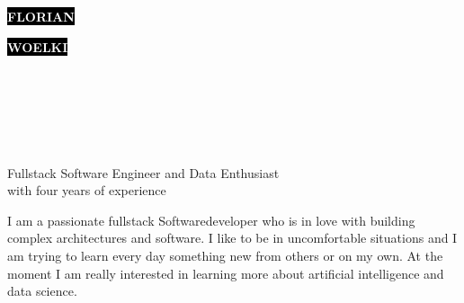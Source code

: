 \documentclass[9pt]{cvstyle}
\begin{document}
\begin{minipage}[t]{0.45\textwidth} 
	\vspace{-\baselineskip}
	
	\colorbox{black}{{\HUGE\textcolor{white}{\textbf{\MakeUppercase{Florian}}}}}
	
	\colorbox{black}{{\HUGE\textcolor{white}{\textbf{\MakeUppercase{Woelki}}}}}
	
	\vspace{6pt}
\end{minipage}
\begin{minipage}[t]{0.275\textwidth}
	\vspace{-\baselineskip}
	
	\\
	\\	
\end{minipage}
\begin{minipage}[t]{0.275\textwidth}
	\vspace{-\baselineskip}
	
	\\
	\\
\end{minipage}
	
{\huge Fullstack Software Engineer and Data Enthusiast\\ with four years of experience}

\vspace{0.5cm}


\begin{minipage}[t]{0.4\textwidth} 
	\vspace{-\baselineskip} 
	
	I am a passionate fullstack Softwaredeveloper who is in love with building complex
	architectures and software. I like to be in uncomfortable situations and I am trying
	to learn every day something new from others or on my own. At the moment I am really
	interested in learning more about artificial intelligence and data science.\\ 
\end{minipage}
\hfill 
\begin{minipage}[t]{0.5\textwidth} 
	\vspace{-\baselineskip} 
	\begin{barchart}{5.5}
	\end{barchart}
\end{minipage}
\end{document}
